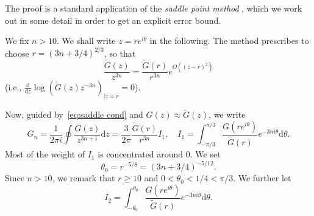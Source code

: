 \documentclass[10pt, conference]{IEEEtran}
\newcommand{\mathd}{\mathrm{d}}
\begin{document}
\begin{IEEEproof}
  The proof is a standard application of the {\emph{saddle point method}}
\cite[{\S}VIII.3]{FlajoletSedgewick2009}, which we work out in
  some detail in order to get an explicit error bound.

  We fix $n > 10$. We shall write $z = r e^{i\theta}$ in the following.
  The method prescribes to choose $r = (3 n + 3 / 4)^{2 / 3}$, so that
  \begin{equation}
    \frac{\tilde{G}(z)}{z^{3 n}} = \frac{\tilde{G}(r)}{r^{3 n}} e^{O((z - r)^2)} \label{eq:saddle cond}
  \end{equation}
  (i.e., $\frac{\mathd}{\mathd z} \log (\tilde{G}(z) z^{- 3
  n})_{\left|z = r \right.} = 0$).

  Now, guided by~\eqref{eq:saddle cond} and $G(z) \approx \tilde{G}(z)$, we write
  \[ G_n = \frac{1}{2 \pi i}  \oint \frac{G(z)}{z^{3 n + 1}}
     \mathd z = \frac{3}{2 \pi}  \frac{\tilde{G}(r)}{r^{3 n}}
     I_1, \quad
     I_1 = \int_{- \pi / 3}^{\pi / 3} \frac{G(re^{i \theta})}{\tilde{G}(r)} e^{- 3 ni \theta} \mathd \theta . \]
  Most of the weight of $I_1$ is concentrated around $0$. We set
  \begin{equation}
    \theta_0 = r^{- 5 / 8} =(3 n + 3 / 4)^{- 5 / 12} .
    \label{eq:theta0}
  \end{equation}
  Since $n > 10$, we remark that $r \geq 10$ and $0 < \theta_0 < 1 / 4 < \pi / 3$.
  We further let
  \[
  I_2 = \int_{-{\theta}_0}^{{\theta}_0}{\frac{G(re^{i{\theta}})}{\tilde{G}(r)}}e^{-3ni{\theta}}{\mathd}{\theta}.
  \]


\end{IEEEproof}
\end{document}
